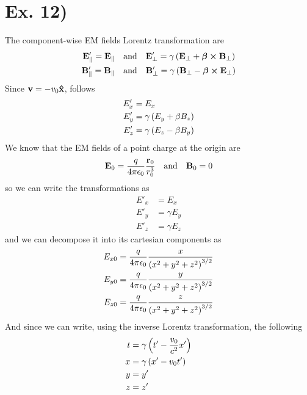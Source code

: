 \documentclass[oneside, 10pt, notitlepage]{book}
\begin{document}
\section*{Ex. 12)}

The component-wise EM fields Lorentz transformation are
\begin{equation}
\begin{split}
\vb{E}'_{\parallel} = \vb{E}_{\parallel} &\qq{and} \vb{E}'_{\perp} = \gamma \lr{\vb{E}_{\perp} + \bm{\beta}\cross \vb{B}_{\perp}} \\
\vb{B}'_{\parallel} = \vb{B}_{\parallel} &\qq{and} \vb{B}'_{\perp} = \gamma \lr{\vb{B}_{\perp} - \bm{\beta}\cross \vb{E}_{\perp}}
\end{split}
\end{equation}
Since \(\vb{v} = - v_0 \vu{x}\), follows
\begin{equation}
\begin{split}
    E'_x &= E_x \\
    E'_y &= \gamma \left(E_y +\beta B_z\right) \\
    E'_z &= \gamma \left(E_z -\beta B_y\right) 
\end{split}
\end{equation}
We know that the EM fields of a point charge at the origin are
\begin{equation}
    \vb{E}_0 = \frac{q}{4\pi\epsilon_0}\frac{\vb{r}_0}{r_0^3} \qq{and} \vb{B}_0 =0
\end{equation}
so we can write the transformations as
\begin{equation}
\begin{split}
    E'_x &= E_x \\
    E'_y &= \gamma E_y \\
    E'_z &= \gamma E_z
\end{split}
\end{equation}
and we can decompose it into its cartesian components as
\begin{equation}
\begin{split}
    E_{x0} &= \frac{q}{4\pi\epsilon_0} \frac{x}{\left(x^2 + y^2 + z^2\right)^{3/2}} \\
    E_{y0} &= \frac{q}{4\pi\epsilon_0} \frac{y}{\left(x^2 + y^2 + z^2\right)^{3/2}} \\
    E_{z0} &= \frac{q}{4\pi\epsilon_0} \frac{z}{\left(x^2 + y^2 + z^2\right)^{3/2}} 
\end{split}
\end{equation}
And since we can write, using the inverse Lorentz transformation, the following
\begin{equation}
\begin{split}
    t &= \gamma\left(t' - \frac{v_0}{c^2}x'\right) \\
    x &= \gamma \left(x'- v_0 t'\right) \\
    y &= y' \\
    z &= z' 
\end{split}
\end{equation}
\end{document}
